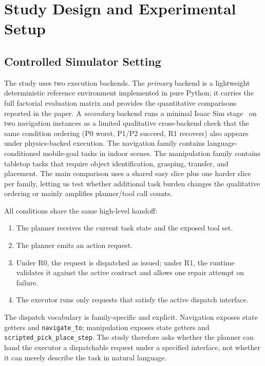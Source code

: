 \section{Study Design and Experimental Setup}

\subsection{Controlled Simulator Setting}

The study uses two execution backends.
The \emph{primary} backend is a lightweight deterministic reference
environment implemented in pure Python; it carries the full factorial
evaluation matrix and provides the quantitative comparisons reported in the
paper. A \emph{secondary} backend runs a minimal Isaac Sim
stage~\cite{nvidiaIsaacSimDocs} on two navigation instances as a limited
qualitative cross-backend check that the same condition ordering (P0 worst,
P1/P2 succeed, R1 recovers) also appears under physics-backed execution.
The navigation family contains language-conditioned mobile-goal tasks in
indoor scenes. The manipulation family contains tabletop tasks that require
object identification, grasping, transfer, and placement. The main comparison
uses a shared easy slice plus one harder slice per family, letting us test
whether additional task burden changes the qualitative ordering or mainly
amplifies planner/tool call counts.

All conditions share the same high-level handoff:

\begin{enumerate}
\item The planner receives the current task state and the exposed tool set.
\item The planner emits an action request.
\item Under R0, the request is dispatched as issued; under R1, the runtime
validates it against the active contract and allows one repair attempt on
failure.
\item The executor runs only requests that satisfy the active dispatch interface.
\end{enumerate}

The dispatch vocabulary is family-specific and explicit. Navigation exposes
state getters and \texttt{navigate\_to}; manipulation exposes state getters
and \texttt{scripted\_pick\_place\_step}. The study therefore asks whether the
planner can hand the executor a dispatchable request under a specified
interface, not whether it can merely describe the task in natural language.

